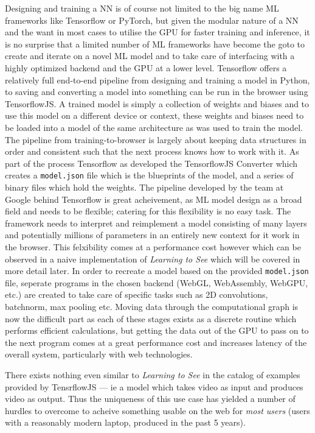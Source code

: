 \documentclass{article}
\begin{document}
Designing and training a NN is of course not limited to the big name ML frameworks like Tensorflow\cite{tf} or PyTorch\cite{pytorch}, but given the modular nature of a NN and the want in most cases to utilise the GPU for faster training and inference, it is no surprise that a limited number of ML frameworks have become the goto to create and iterate on a novel ML model and to take care of interfacing with a highly optimized backend and the GPU at a lower level. Tensorflow offers a relatively full end-to-end pipeline from designing and training a model in Python, to saving and converting a model into something can be run in the browser using TensorflowJS\cite{tfjs}. A trained model is simply a collection of weights and biases and to use this model on a different device or context, these weights and biases need to be loaded into a model of the same architecture as was used to train the model. The pipeline from training-to-browser is largely about keeping data structures in order and consistent such that the next process knows how to work with it. As part of the process Tensorflow as developed the TensorflowJS Converter\cite{tfjs_converter} which creates a \verb|model.json| file which is the blueprints of the model, and a series of binary files which hold the weights. The pipeline developed by the team at Google behind Tensorflow is great acheivement, as ML model design as a broad field and needs to be flexible; catering for this flexibility is no easy task. The framework needs to interpret and reimplement a model consisting of many layers and potentially millions of parameters in an entirely new context for it work in the browser. This felxibility comes at a performance cost however which can be observed in a naive implementation of \textit{Learning to See} which will be covered in more detail later. In order to recreate a model based on the provided \verb|model.json| file, seperate programs in the chosen backend (WebGL, WebAssembly, WebGPU, etc.) are created to take care of specific tasks such as 2D convolutions, batchnorm, max pooling etc. Moving data through the computational graph is now the difficult part as each of these stages exists as a discrete routine which performs efficient calculations, but getting the data out of the GPU to pass on to the next program comes at a great performance cost and increases latency of the overall system, particularly with web technologies\cite{optimizing_webgl}.

There exists nothing even similar to \textit{Learning to See} in the catalog of examples provided by TensrflowJS --- ie a model which takes video as input and produces video as output. Thus the uniqueness of this use case has yielded a number of hurdles to overcome to acheive something usable on the web for \textit{most users} (users with a reasonably modern laptop, produced in the past 5 years).
\end{document}
